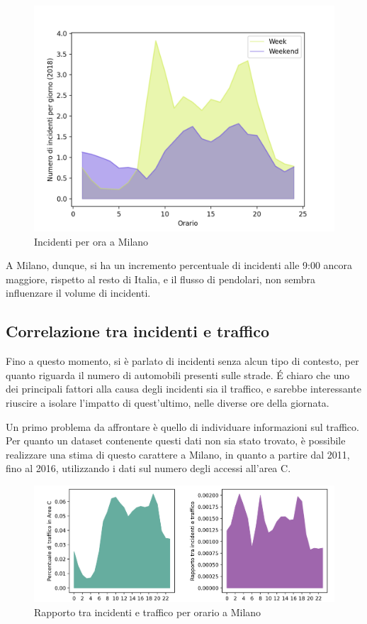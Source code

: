 \documentclass[a4paper]{report}
\begin{document}
\begin{figure}
    \includegraphics[width=\linewidth]{../src/incidenti/incidenti_senza_coords/ore_punta/week_weekend_milano.png}
    \caption{Incidenti per ora a Milano}
    \label{fig:week-weekend-milano}
\end{figure}

A Milano, dunque, si ha un incremento percentuale di incidenti alle 9:00 ancora maggiore,
rispetto al resto di Italia, e il flusso di pendolari, non sembra influenzare il volume di incidenti.

\subsection{Correlazione tra incidenti e traffico}

Fino a questo momento, si è parlato di incidenti senza alcun tipo di contesto, per quanto riguarda 
il numero di automobili presenti sulle strade. 
\'E chiaro che uno dei principali fattori alla causa degli incidenti sia il traffico, e sarebbe 
interessante riuscire a isolare l'impatto di quest'ultimo, nelle diverse ore della giornata.

Un primo problema da affrontare è quello di individuare informazioni sul traffico. 
Per quanto un dataset contenente questi dati non sia stato trovato, 
è possibile realizzare una stima di questo carattere a Milano, 
in quanto a partire dal 2011, fino al 2016, utilizzando i dati sul numero degli accessi all'area C.

\begin{figure}
    \includegraphics[width=\linewidth]{../src/area_c/rapporto_orario.png}
    \caption{Rapporto tra incidenti e traffico per orario a Milano}
    \label{fig:rapporto-incidenti-traffico}
\end{figure}
\end{document}
